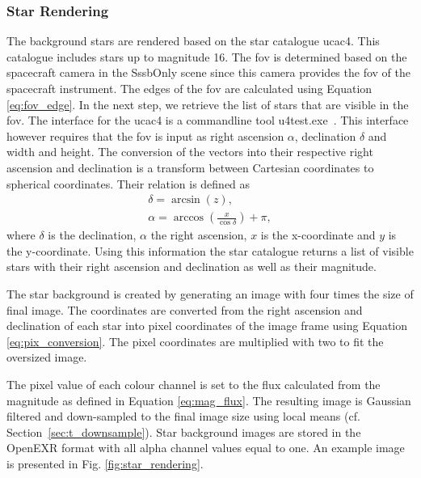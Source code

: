 \subsubsection{Star Rendering} \label{sec:stars}
The background stars are rendered based on the star catalogue \gls{ucac4}. This catalogue includes stars up to magnitude 16. The \gls{fov} is determined based on the spacecraft camera in the SssbOnly scene since this camera provides the \gls{fov} of the spacecraft instrument. The edges of the \gls{fov} are calculated using Equation \ref{eq:fov_edge}. 
In the next step, we retrieve the list of stars that are visible in the \gls{fov}. The interface for the \gls{ucac4} is a commandline tool u4test.exe~\cite{gray}. This interface however requires that the \gls{fov} is input as right ascension $\alpha$, declination $\delta$ and width and height.
The conversion of the vectors into their respective right ascension and declination is a transform between Cartesian coordinates to spherical coordinates. Their relation is defined as
\begin{align}
    \delta = \arcsin{(z)}, \label{eq:declination} \\
    \alpha = \arccos{\left(\frac{x}{\cos{\delta}}\right)} + \pi, \label{eq:right_ascension}
\end{align}
where $\delta$ is the declination, $\alpha$ the right ascension, $x$ is the x-coordinate and $y$ is the y-coordinate. Using this information the star catalogue returns a list of visible stars with their right ascension and declination as well as their magnitude.

The star background is created by generating an image with four times the size of final image. The coordinates are converted from the right ascension and declination of each star into pixel coordinates of the image frame using Equation \ref{eq:pix_conversion}. The pixel coordinates are multiplied with two to fit the oversized image.

The pixel value of each colour channel is set to the flux calculated from the magnitude as defined in Equation \ref{eq:mag_flux}. The resulting image is Gaussian filtered and down-sampled to the final image size using local means (cf. Section~\ref{sec:t_downsample}). Star background images are stored in the OpenEXR format with all alpha channel values equal to one. An example image is presented in Fig. \ref{fig:star_rendering}.


